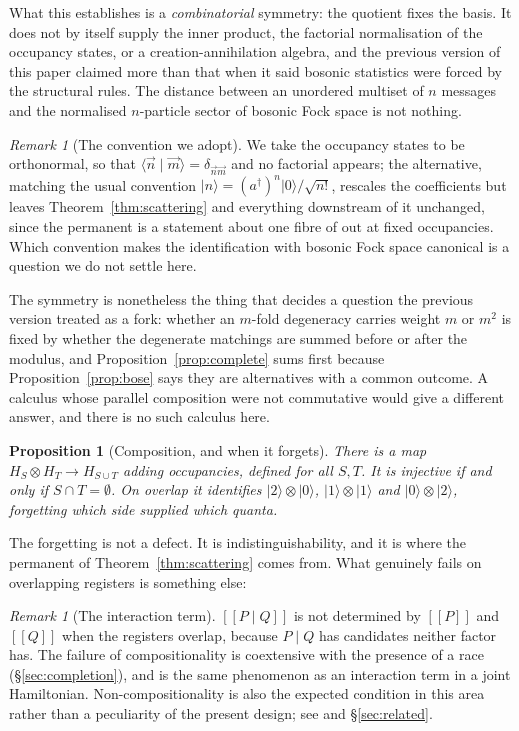\documentclass[11pt,a4paper]{article}
\theoremstyle{plain}
\newtheorem{proposition}[theorem]{Proposition}
\theoremstyle{definition}
\theoremstyle{remark}
\newtheorem{remark}[theorem]{Remark}
\newcommand{\sem}[1]{[\![#1]\!]}
\newcommand{\Out}{\mathrm{out}}
\newcommand{\ket}[1]{\lvert #1 \rangle}
\begin{document}
What this establishes is a \emph{combinatorial} symmetry: the quotient fixes the
basis. It does not by itself supply the inner product, the factorial
normalisation of the occupancy states, or a creation-annihilation algebra, and
the previous version of this paper claimed more than that when it said bosonic
statistics were forced by the structural rules. The distance between an
unordered multiset of $n$ messages and the normalised $n$-particle sector of
bosonic Fock space is not nothing.

\begin{remark}[The convention we adopt]\label{rem:convention}
We take the occupancy states to be orthonormal, so that
$\langle \vec{n} \mid \vec{m}\rangle = \delta_{\vec{n}\vec{m}}$ and no factorial
appears; the alternative, matching the usual convention
$\ket{n} = (a^{\dagger})^{n}\ket{0}/\sqrt{n!}$, rescales the coefficients but
leaves Theorem~\ref{thm:scattering} and everything downstream of it unchanged,
since the permanent is a statement about one fibre of $\Out$ at fixed
occupancies. Which convention makes the identification with bosonic Fock space
canonical is a question we do not settle here.
\end{remark}

The symmetry is nonetheless the thing that decides a question the previous
version treated as a fork: whether an $m$-fold degeneracy carries weight $m$ or
$m^{2}$ is fixed by whether the degenerate matchings are summed before or after
the modulus, and Proposition~\ref{prop:complete} sums first because
Proposition~\ref{prop:bose} says they are alternatives with a common outcome. A
calculus whose parallel composition were not commutative would give a different
answer, and there is no such calculus here.

\begin{proposition}[Composition, and when it forgets]\label{prop:compose}
There is a map $H_S \otimes H_T \to H_{S \cup T}$ adding occupancies, defined
for all $S, T$. It is injective if and only if $S \cap T = \emptyset$. On
overlap it identifies $\ket{2}\otimes\ket{0}$, $\ket{1}\otimes\ket{1}$ and
$\ket{0}\otimes\ket{2}$, forgetting which side supplied which quanta.
\end{proposition}

The forgetting is not a defect. It is indistinguishability, and it is where the
permanent of Theorem~\ref{thm:scattering} comes from. What genuinely fails on
overlapping registers is something else:

\begin{remark}[The interaction term]\label{rem:interaction}
$\sem{P \mid Q}$ is not determined by $\sem{P}$ and $\sem{Q}$ when the registers
overlap, because $P \mid Q$ has candidates neither factor has. The failure of
compositionality is coextensive with the presence of a race
(\S\ref{sec:completion}), and is the same phenomenon as an interaction term in a
joint Hamiltonian. Non-compositionality is also the expected condition in this
area rather than a peculiarity of the present design; see \cite{YingYuFeng} and
\S\ref{sec:related}.
\end{remark}
\end{document}
